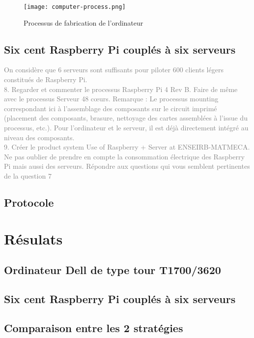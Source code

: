 \documentclass[12pt,a4paper]{paper}
\begin{document}
\begin{figure}[h!]%
    \centering
    \texttt{[image: computer-process.png]}
    \caption{Processus de fabrication de l'ordinateur}
    \label{fig:computer-process}
\end{figure}

\subsection{Six cent Raspberry Pi couplés à six serveurs}
\textcolor{gray}{
On considère que 6 serveurs sont suffisants pour piloter 600 clients légers constitués de Raspberry
Pi.\\
8. Regarder et commenter le processus Raspberry Pi 4 Rev B. Faire de même avec le processus
Serveur 48 cœurs. Remarque : Le processus mounting correspondant ici à l’assemblage des
composants sur le circuit imprimé (placement des composants, brasure, nettoyage des cartes
assemblées à l’issue du processus, etc.). Pour l’ordinateur et le serveur, il est déjà directement
intégré au niveau des composants.\\
9. Créer le product system Use of Raspberry + Server at ENSEIRB-MATMECA. Ne pas oublier
de prendre en compte la consommation électrique des Raspberry Pi mais aussi des serveurs.
Répondre aux questions qui vous semblent pertinentes de la question 7\cite{Dell2018}
}


\subsection{Protocole}
\textcolor{gray}{\lipsum[1-2] }


\section{Résulats}
\subsection{Ordinateur Dell de type tour T1700/3620}
\textcolor{gray}{\lipsum[1-2] }

\subsection{Six cent Raspberry Pi couplés à six serveurs}
\textcolor{gray}{\lipsum[1-2] }

\subsection{Comparaison entre les 2 stratégies}
\end{document}

